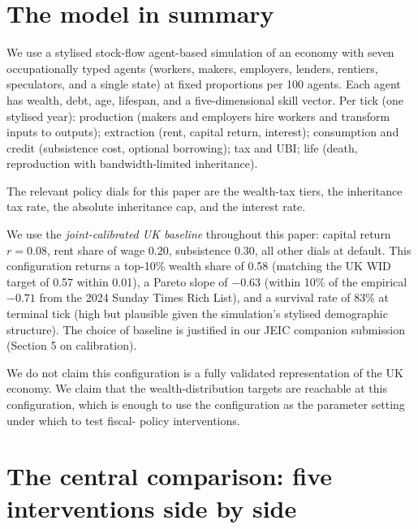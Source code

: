 \documentclass[11pt]{article}
\begin{document}
\section{The model in summary}
\label{sec:model}

We use a stylised stock-flow agent-based simulation of an economy
with seven occupationally typed agents (workers, makers, employers,
lenders, rentiers, speculators, and a single state) at fixed
proportions per 100 agents.  Each agent has wealth, debt, age,
lifespan, and a five-dimensional skill vector.  Per tick (one
stylised year): production (makers and employers hire workers and
transform inputs to outputs); extraction (rent, capital return,
interest); consumption and credit (subsistence cost, optional
borrowing); tax and UBI; life (death, reproduction with
bandwidth-limited inheritance).

The relevant policy dials for this paper are the wealth-tax tiers,
the inheritance tax rate, the absolute inheritance cap, and the
interest rate.

We use the \emph{joint-calibrated UK baseline} throughout this
paper: capital return $r = 0.08$, rent share of wage $0.20$,
subsistence $0.30$, all other dials at default.  This configuration
returns a top-10\% wealth share of 0.58 (matching the UK WID
target of 0.57 within 0.01), a Pareto slope of $-0.63$ (within 10\%
of the empirical $-0.71$ from the 2024 Sunday Times Rich List), and
a survival rate of 83\% at terminal tick (high but plausible given
the simulation's stylised demographic structure).  The choice of
baseline is justified in our JEIC companion submission
(Section 5 on calibration).

We do not claim this configuration is a fully validated representation
of the UK economy.  We claim that the wealth-distribution targets are
reachable at this configuration, which is enough to use the
configuration as the parameter setting under which to test fiscal-
policy interventions.

\section{The central comparison: five interventions side by side}
\label{sec:comparison}
\end{document}
